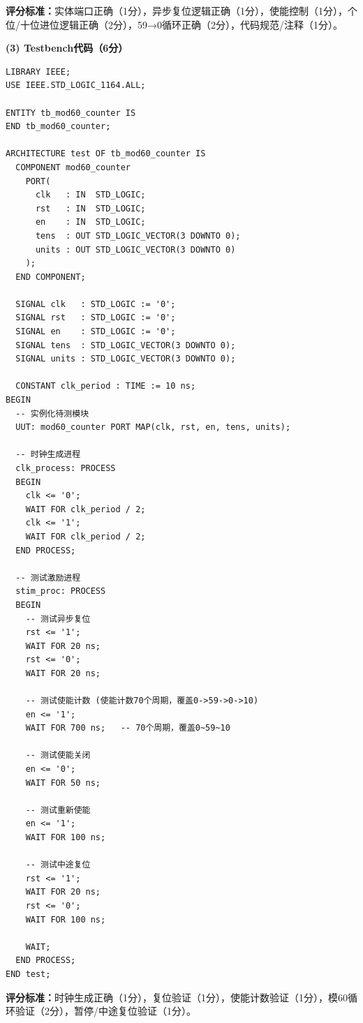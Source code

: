 \textbf{评分标准：}实体端口正确（1分），异步复位逻辑正确（1分），使能控制（1分），个位/十位进位逻辑正确（2分），59→0循环正确（2分），代码规范/注释（1分）。

\vspace{0.3cm}

\textbf{(3) Testbench代码（6分）}

\begin{lstlisting}[caption={模60计数器测试平台}]
LIBRARY IEEE;
USE IEEE.STD_LOGIC_1164.ALL;

ENTITY tb_mod60_counter IS
END tb_mod60_counter;

ARCHITECTURE test OF tb_mod60_counter IS
  COMPONENT mod60_counter
    PORT(
      clk   : IN  STD_LOGIC;
      rst   : IN  STD_LOGIC;
      en    : IN  STD_LOGIC;
      tens  : OUT STD_LOGIC_VECTOR(3 DOWNTO 0);
      units : OUT STD_LOGIC_VECTOR(3 DOWNTO 0)
    );
  END COMPONENT;

  SIGNAL clk   : STD_LOGIC := '0';
  SIGNAL rst   : STD_LOGIC := '0';
  SIGNAL en    : STD_LOGIC := '0';
  SIGNAL tens  : STD_LOGIC_VECTOR(3 DOWNTO 0);
  SIGNAL units : STD_LOGIC_VECTOR(3 DOWNTO 0);

  CONSTANT clk_period : TIME := 10 ns;
BEGIN
  -- 实例化待测模块
  UUT: mod60_counter PORT MAP(clk, rst, en, tens, units);

  -- 时钟生成进程
  clk_process: PROCESS
  BEGIN
    clk <= '0';
    WAIT FOR clk_period / 2;
    clk <= '1';
    WAIT FOR clk_period / 2;
  END PROCESS;

  -- 测试激励进程
  stim_proc: PROCESS
  BEGIN
    -- 测试异步复位
    rst <= '1';
    WAIT FOR 20 ns;
    rst <= '0';
    WAIT FOR 20 ns;

    -- 测试使能计数 (使能计数70个周期，覆盖0->59->0->10)
    en <= '1';
    WAIT FOR 700 ns;   -- 70个周期，覆盖0~59~10

    -- 测试使能关闭
    en <= '0';
    WAIT FOR 50 ns;

    -- 测试重新使能
    en <= '1';
    WAIT FOR 100 ns;

    -- 测试中途复位
    rst <= '1';
    WAIT FOR 20 ns;
    rst <= '0';
    WAIT FOR 100 ns;

    WAIT;
  END PROCESS;
END test;
\end{lstlisting}

\textbf{评分标准：}时钟生成正确（1分），复位验证（1分），使能计数验证（1分），模60循环验证（2分），暂停/中途复位验证（1分）。

\vspace{0.3cm}

